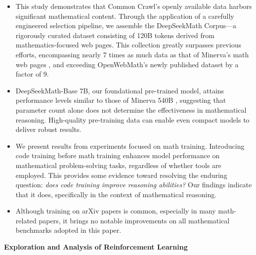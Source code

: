 \begin{itemize}[topsep=0pt]
    \item This study demonstrates that Common Crawl’s openly available data harbors significant mathematical content. Through the application of a carefully engineered selection pipeline, we assemble the DeepSeekMath Corpus—a rigorously curated dataset consisting of 120B tokens derived from mathematics-focused web pages. This collection greatly surpasses previous efforts, encompassing nearly 7 times as much data as that of Minerva’s math web pages \citep{minerva}, and exceeding OpenWebMath’s newly published dataset \citep{openwebmath} by a factor of 9.

\item DeepSeekMath-Base 7B, our foundational pre-trained model, attains performance levels similar to those of Minerva 540B \citep{minerva}, suggesting that parameter count alone does not determine the effectiveness in mathematical reasoning. High-quality pre-training data can enable even compact models to deliver robust results.

\item We present results from experiments focused on math training. Introducing code training before math training enhances model performance on mathematical problem-solving tasks, regardless of whether tools are employed. This provides some evidence toward resolving the enduring question: \textit{does code training improve reasoning abilities?} Our findings indicate that it does, specifically in the context of mathematical reasoning.

    \item Although training on arXiv papers is common, especially in many math-related papers, it brings no notable improvements on all mathematical benchmarks adopted in this paper.
\end{itemize}

\textbf{Exploration and Analysis of Reinforcement Learning}

